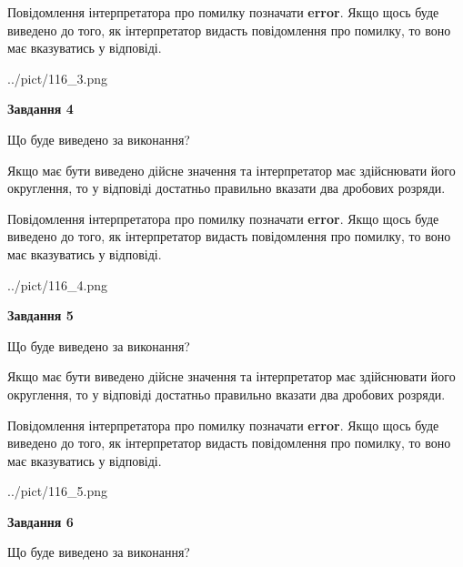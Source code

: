 \documentclass[12pt, ukrainian]{article}
\begin{document}
{\begin {Large}
Повідомлення інтерпретатора про помилку позначати \textbf{error}.
Якщо щось буде виведено до того, як інтерпретатор видасть повідомлення про помилку, 
то воно має вказуватись у відповіді. \par

\begin{center}
	{../pict/116_3.png}
\end{center}
\newpage

{\begin {center}\textbf{Завдання 4}\end {center}}\par
Що буде виведено за виконання? \par

Якщо має бути виведено дійсне значення та інтерпретатор має здійснювати його округлення, 
то у відповіді достатньо правильно вказати два дробових розряди.

Повідомлення інтерпретатора про помилку позначати \textbf{error}.
Якщо щось буде виведено до того, як інтерпретатор видасть повідомлення про помилку, 
то воно має вказуватись у відповіді. \par

\begin{center}
	{../pict/116_4.png}
\end{center}
\newpage

{\begin {center}\textbf{Завдання 5}\end {center}}\par
Що буде виведено за виконання? \par

Якщо має бути виведено дійсне значення та інтерпретатор має здійснювати його округлення, 
то у відповіді достатньо правильно вказати два дробових розряди.

Повідомлення інтерпретатора про помилку позначати \textbf{error}.
Якщо щось буде виведено до того, як інтерпретатор видасть повідомлення про помилку, 
то воно має вказуватись у відповіді. \par

\begin{center}
	{../pict/116_5.png}
\end{center}
\newpage

{\begin {center}\textbf{Завдання 6}\end {center}}\par
Що буде виведено за виконання? \par


\end{Large}}
\end{document}

